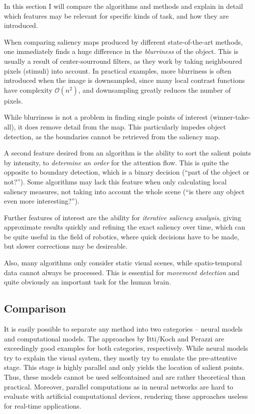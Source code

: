 \documentclass[a4paper,12pt,fleqn,oneside]{scrartcl}
\begin{document}
In this section I will compare the algorithms and methods and explain in detail which features may be relevant for
specific kinds of task, and how they are introduced.

When comparing saliency maps produced by different state-of-the-art methods, one immediately finds a huge difference in
the \emph{blurriness} of the object. This is usually a result of center-sourround filters, as they work by taking
neighboured pixels (stimuli) into account. In practical examples, more blurriness is often introduced when the image is
downsampled, since many local contrast functions have complexity $\mathcal{O}(n^2)$, and downsampling greatly reduces
the number of pixels.

While blurriness is not a problem in finding single points of interest (winner-take-all), it does remove detail from the
map. This particularly impedes object detection, as the boundaries cannot be retrieved from the saliency map.

A second feature desired from an algorithm is the ability to sort the salient points by intensity, to \emph{determine an
order} for the attention flow. This is quite the opposite to boundary detection, which is a binary decision (``part of
the object or not?''). Some algorithms may lack this feature when only calculating local saliency measures, not taking
into account the whole scene (``is there any object even more interesting?'').

Further features of interest are the ability for \emph{iterative saliency analysis}, giving approximate results quickly
and  refining the exact saliency over time, which can be quite useful in the field of robotics, where quick decisions
have to be made, but slower corrections may be desireable.

Also, many algorithms only consider static visual scenes, while spatio-temporal data cannot always be processed. This is
essential for \emph{movement detection} and quite obviously an important task for the human brain.

\subsection{Comparison}

It is easily possible to separate any method into two categories -- neural models and computational models. The
approaches by Itti/Koch and Perazzi are exceedingly good examples for both categories, respectively. While neural models
try to  explain the visual system, they mostly try to emulate the pre-attentive stage. This stage is highly
parallel\cite{itti2001} and only yields the location of salient points. Thus, these models cannot be used selfcontained
and are rather theoretical than practical. Moreover, parallel computations as in neural networks are hard to evaluate
with artificial computational devices, rendering these approaches useless for real-time applications.
\end{document}
